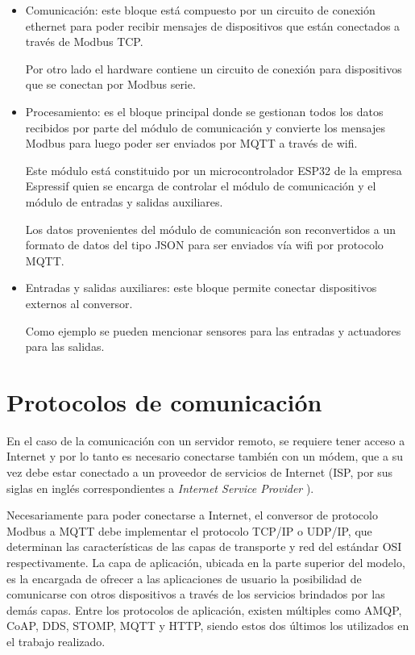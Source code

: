\begin{itemize}
	\item Comunicación: este bloque está compuesto por un circuito de conexión ethernet para poder recibir mensajes de dispositivos que están conectados a través de Modbus TCP. 
	
	Por otro lado el hardware contiene un circuito de conexión para dispositivos que se conectan por Modbus serie.
	
	\item Procesamiento: es el bloque principal donde se gestionan todos los datos recibidos por parte del módulo de comunicación y  convierte los mensajes Modbus para luego poder ser enviados por MQTT a través de wifi.  
	
	Este módulo está constituido por un microcontrolador ESP32 \citep{WEBSITE:11} de la empresa Espressif \citep{WEBSITE:10} quien se encarga de controlar el módulo de comunicación y el módulo de entradas y salidas auxiliares.
	
	Los datos provenientes del módulo de comunicación son reconvertidos a un formato de datos del tipo JSON \citep{WEBSITE:12} para ser enviados vía wifi por protocolo MQTT.
	
	
	\item Entradas y salidas auxiliares: este bloque permite conectar dispositivos externos al conversor. 
	
	Como ejemplo se pueden mencionar sensores para las entradas y actuadores para las salidas. 
	
	
\end{itemize}


\section{Protocolos de comunicación}
En el caso de la comunicación con un servidor remoto, se requiere tener acceso a Internet y por lo tanto es necesario conectarse también con un módem, que a
su vez debe estar conectado a un proveedor de servicios de Internet (ISP, por sus siglas en inglés correspondientes a \textit{Internet Service Provider} ).

Necesariamente para poder conectarse a Internet, el conversor de protocolo Modbus a MQTT debe implementar el protocolo TCP/IP\citep{WEBSITE:15} o UDP/IP,\citep{WEBSITE:16} que determinan las características de las capas de transporte y red del estándar OSI \citep{WEBSITE:13} respectivamente. La capa de aplicación, ubicada en la parte superior del modelo, es la encargada de ofrecer a las aplicaciones de usuario la posibilidad de comunicarse con otros dispositivos a través de los servicios brindados por las demás capas. Entre los protocolos de aplicación, existen múltiples como AMQP, CoAP, DDS, STOMP, MQTT y HTTP, siendo estos dos últimos los utilizados en el trabajo realizado.

